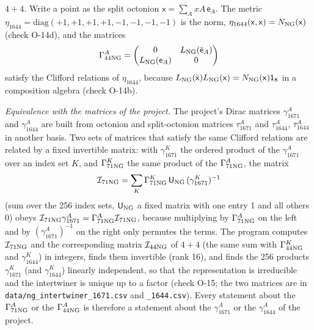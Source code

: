 \emph{$4+4$.} Write a point as the split octonion $\mathsf x=\sum_A xA\,\mathsf e_A$. The metric
$\eta_{1644}=\mathrm{diag}(+1,+1,+1,+1,-1,-1,-1,-1)$ is the norm, $\eta_{1644}(\mathsf x,\mathsf x)=N_{\rm NG}(\mathsf x)$
(check O-14d), and the matrices
\begin{equation}
\Gamma^A_{44\rm NG}=\begin{pmatrix}0&L_{\rm NG}(\bar{\mathsf e}_A)\\L_{\rm NG}(\mathsf e_A)&0\end{pmatrix}
\label{eq:gamma44oct}
\end{equation}
satisfy the Clifford relations of $\eta_{1644}$, because $L_{\rm NG}(\bar{\mathsf x})L_{\rm NG}(\mathsf x)=
N_{\rm NG}(\mathsf x)\mathsf 1_8$ in a composition algebra (check O-14b).

\emph{Equivalence with the matrices of the project.} The project's Dirac matrices
$\gamma^A_{1671}$ and $\gamma^A_{1644}$ are built from octonion and split-octonion matrices
$\tau^A_{1671}$ and $\tau^A_{1644}$, $\bar\tau^A_{1644}$ in another basis. Two sets of matrices that
satisfy the same Clifford relations are related by a fixed invertible matrix: with $\gamma^K_{1671}$
the ordered product of the $\gamma^A_{1671}$ over an index set $K$, and $\Gamma^K_{71\rm NG}$ the same
product of the $\Gamma^A_{71\rm NG}$, the matrix
\begin{equation}
\mathcal I_{71\rm NG}=\sum_K\Gamma^K_{71\rm NG}\,\mathsf U_{\rm NG}\,(\gamma^K_{1671})^{-1}
\label{eq:intertwiner}
\end{equation}
(sum over the 256 index sets, $\mathsf U_{\rm NG}$ a fixed matrix with one entry 1 and all others 0) obeys
$\mathcal I_{71\rm NG}\gamma^A_{1671}=\Gamma^A_{71\rm NG}\mathcal I_{71\rm NG}$, because multiplying by
$\Gamma^A_{71\rm NG}$ on the left and by $(\gamma^A_{1671})^{-1}$ on the right only permutes the terms.
The program computes $\mathcal I_{71\rm NG}$ and the corresponding matrix $\mathcal I_{44\rm NG}$ of $4+4$ (the same
sum with $\Gamma^K_{44\rm NG}$ and $\gamma^K_{1644}$) in integers, finds them invertible (rank 16), and
finds the 256 products $\gamma^K_{1671}$ (and $\gamma^K_{1644}$) linearly independent, so that the
representation is irreducible and the intertwiner is unique up to a factor (check O-15; the two
matrices are in \texttt{data/ng\_intertwiner\_1671.csv} and \texttt{\_1644.csv}). Every statement about the
$\Gamma^A_{71\rm NG}$ or the $\Gamma^A_{44\rm NG}$ is therefore a statement about the $\gamma^A_{1671}$ or the
$\gamma^A_{1644}$ of the project.

